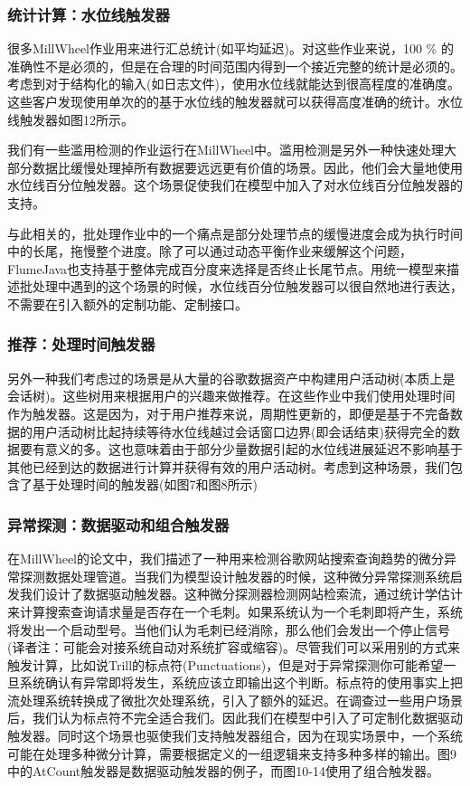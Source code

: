 \documentclass[oneside]{ctexbook}
\begin{document}
\subsubsection{统计计算：水位线触发器}

很多MillWheel作业用来进行汇总统计(如平均延迟)。对这些作业来说，100 \% 的准确性不是必须的，但是在合理的时间范围内得到一个接近完整的统计是必须的。考虑到对于结构化的输入(如日志文件)，使用水位线就能达到很高程度的准确度。这些客户发现使用单次的的基于水位线的触发器就可以获得高度准确的统计。水位线触发器如图12所示。

我们有一些滥用检测的作业运行在MillWheel中。滥用检测是另外一种快速处理大部分数据比缓慢处理掉所有数据要远远更有价值的场景。因此，他们会大量地使用水位线百分位触发器。这个场景促使我们在模型中加入了对水位线百分位触发器的支持。

与此相关的，批处理作业中的一个痛点是部分处理节点的缓慢进度会成为执行时间中的长尾，拖慢整个进度。除了可以通过动态平衡作业来缓解这个问题，FlumeJava也支持基于整体完成百分度来选择是否终止长尾节点。用统一模型来描述批处理中遇到的这个场景的时候，水位线百分位触发器可以很自然地进行表达，不需要在引入额外的定制功能、定制接口。

\subsubsection{推荐：处理时间触发器}

另外一种我们考虑过的场景是从大量的谷歌数据资产中构建用户活动树(本质上是会话树)。这些树用来根据用户的兴趣来做推荐。在这些作业中我们使用处理时间作为触发器。这是因为，对于用户推荐来说，周期性更新的，即便是基于不完备数据的用户活动树比起持续等待水位线越过会话窗口边界(即会话结束)获得完全的数据要有意义的多。这也意味着由于部分少量数据引起的水位线进展延迟不影响基于其他已经到达的数据进行计算并获得有效的用户活动树。考虑到这种场景，我们包含了基于处理时间的触发器(如图7和图8所示)

\subsubsection{异常探测：数据驱动和组合触发器}

在MillWheel的论文中，我们描述了一种用来检测谷歌网站搜索查询趋势的微分异常探测数据处理管道。当我们为模型设计触发器的时候，这种微分异常探测系统启发我们设计了数据驱动触发器。这种微分探测器检测网站检索流，通过统计学估计来计算搜索查询请求量是否存在一个毛刺。如果系统认为一个毛刺即将产生，系统将发出一个启动型号。当他们认为毛刺已经消除，那么他们会发出一个停止信号(译者注：可能会对接系统自动对系统扩容或缩容)。尽管我们可以采用别的方式来触发计算，比如说Trill的标点符(Punctuations)，但是对于异常探测你可能希望一旦系统确认有异常即将发生，系统应该立即输出这个判断。标点符的使用事实上把流处理系统转换成了微批次处理系统，引入了额外的延迟。在调查过一些用户场景后，我们认为标点符不完全适合我们。因此我们在模型中引入了可定制化数据驱动触发器。同时这个场景也驱使我们支持触发器组合，因为在现实场景中，一个系统可能在处理多种微分计算，需要根据定义的一组逻辑来支持多种多样的输出。图9中的AtCount触发器是数据驱动触发器的例子，而图10-14使用了组合触发器。
\end{document}

